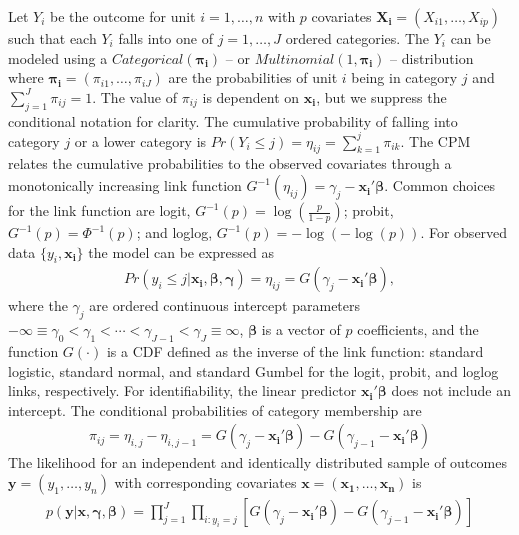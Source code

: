 \documentclass[
]{article}
\begin{document}
Let \(Y_i\) be the outcome for unit \(i=1,\ldots,n\) with \(p\) covariates \(\boldsymbol{X_i}=(X_{i1},\ldots,X_{ip})\) such that each \(Y_i\) falls into one of \(j=1,\ldots, J\) ordered categories. The \(Y_i\) can be modeled using a \(Categorical(\boldsymbol{\pi_i})\) -- or \(Multinomial(1,\boldsymbol{\pi_i})\) -- distribution where \(\boldsymbol{\pi_i}=(\pi_{i1}, \ldots, \pi_{iJ})\) are the probabilities of unit \(i\) being in category \(j\) and \(\sum_{j=1}^{J}\pi_{ij}=1\). The value of \(\pi_{ij}\) is dependent on \(\boldsymbol{x_i}\), but we suppress the conditional notation for clarity. The cumulative probability of falling into category \(j\) or a lower category is \(Pr(Y_i \le j)=\eta_{ij}=\sum_{k=1}^{j}\pi_{ik}\). The CPM relates the cumulative probabilities to the observed covariates through a monotonically increasing link function \(G^{-1}(\eta_{ij})=\gamma_{j}-\boldsymbol{x_i'\beta}\). Common choices for the link function are logit, \(G^{-1}(p)=\log\left(\frac{p}{1-p}\right)\); probit, \(G^{-1}(p)=\Phi^{-1}(p)\); and loglog, \(G^{-1}(p)=-\log(-\log(p))\). For observed data \(\{y_i,\boldsymbol{x_i}\}\) the model can be expressed as
\begin{gather}
Pr(y_i \le j|\boldsymbol{x_i},\boldsymbol{\beta},\boldsymbol{\gamma})=\eta_{ij}=G(\gamma_{j}-\boldsymbol{x_i'\beta}),
\end{gather}
where the \(\gamma_j\) are ordered continuous intercept parameters \(-\infty \equiv \gamma_0 < \gamma_1 < \cdots < \gamma_{J-1} <\gamma_J \equiv \infty\), \(\boldsymbol{\beta}\) is a vector of \(p\) coefficients, and the function \(G(\cdot)\) is a CDF defined as the inverse of the link function: standard logistic, standard normal, and standard Gumbel for the logit, probit, and loglog links, respectively. For identifiability, the linear predictor \(\boldsymbol{x_i'\beta}\) does not include an intercept. The conditional probabilities of category membership are
\begin{gather}
\label{eq:cellprobs}
\pi_{ij}=\eta_{i,j}-\eta_{i,j-1}=G(\gamma_j-\boldsymbol{x_i'\beta})-G(\gamma_{j-1}-\boldsymbol{x_i'\beta})
\end{gather}
The likelihood for an independent and identically distributed sample of outcomes \(\boldsymbol{y}=(y_1,\ldots,y_n)\) with corresponding covariates \(\boldsymbol{x}=(\boldsymbol{x_1},\ldots,\boldsymbol{x_n})\) is
\begin{gather}
p(\boldsymbol{y}|\boldsymbol{x},\boldsymbol{\gamma},\boldsymbol{\beta})=
\prod_{j=1}^{J}\prod_{i:y_i=j}[G(\gamma_j-\boldsymbol{x_i'\beta})-G(\gamma_{j-1}-\boldsymbol{x_i'\beta})]
\end{gather}
\end{document}
